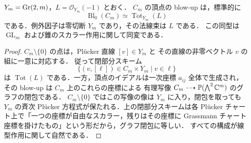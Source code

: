 \begin{lemma}
\label{lemma:cone-blowup}
$Y_m=\operatorname{Gr}(2,m)$，$L=\mathcal O_{Y_m}(-1)$ とおく．
$C_m$ の頂点の blow-up は，標準的に
\[
 \operatorname{Bl}_0(C_m)\simeq\operatorname{Tot}_{Y_m}(L)
\]
である．例外因子は零切断 $Y_m$ であり，その法線束は $L$ である．
この同型は $\operatorname{GL}_m$ および錐のスカラー作用に関して同変である．
\end{lemma}
\begin{proof}
$C_m\setminus\{0\}$ の点は，Pl\"ucker 直線 $[v]\in Y_m$ と
その直線の非零ベクトル $v$ の組に一意に対応する．
従って閉部分スキーム
\[
 \{(v,[\ell])\in C_m\times Y_m\mid v\in\ell\}
\]
は $\operatorname{Tot}(L)$ である．一方，頂点のイデアルは一次座標
$a_{ij}$ 全体で生成され，その blow-up は $C_m$ 上のこれらの座標による
有理写像 $C_m\dashrightarrow\mathbb P(\bigwedge^2\mathbb C^m)$ のグラフの閉包である．
$C_m\setminus\{0\}$ ではこの写像の像は $Y_m$ に入り，閉包を取っても
$Y_m$ の斉次 Pl\"ucker 方程式が保たれる．上の閉部分スキームは各
Pl\"ucker チャート上で「一つの座標が自由なスカラー，残りはその座標に
Grassmann チャート座標を掛けたもの」という形だから，グラフ閉包に等しい．
すべての構成が線型作用に関して自然である．
\end{proof}

